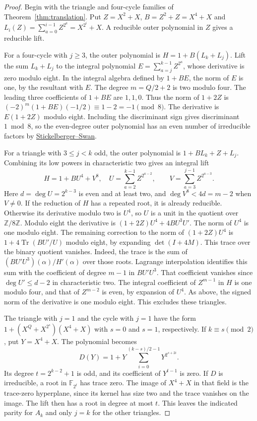 \documentclass[11pt]{article}
\begin{document}
\begin{proof}
Begin with the triangle and four-cycle families of
Theorem~\ref{thm:translation}. Put \(Z=X^2+X\), \(B=Z^2+Z=X^4+X\)
and \(L_i(Z)=\sum_{a=0}^{i-1}Z^{2^a}=X^{2^i}+X\).
A reducible outer polynomial in \(Z\) gives a reducible lift.

For a four-cycle with \(j\ge3\), the outer polynomial is
\(H=1+B(L_k+L_j)\). Lift the sum \(L_k+L_j\) to the integral
polynomial \(E=\sum_{a=j}^{k-1}Z^{2^a}\), whose derivative is
zero modulo eight. In the integral algebra defined by \(1+BE\),
the norm of \(E\) is one, by the resultant with \(E\).
The degree \(m=Q/2+2\) is two modulo four. The leading three
coefficients of \(1+BE\) are \(1,1,0\).
Thus the norm of \(1+2Z\) is
\((-2)^m(1+BE)(-1/2)\equiv1-2=-1\pmod8\).
The derivative is \(E(1+2Z)\) modulo eight. Including the
discriminant sign gives discriminant \(1\bmod8\), so the even-degree
outer polynomial has an even number of irreducible factors by
\href{https://msp.org/pjm/1962/12-3/pjm-v12-n3-p27-p.pdf}
{Stickelberger--Swan}.

For a triangle with \(3\le j<k\) odd, the outer polynomial is
\(1+B L_k+Z+L_j\). Combining its low powers in characteristic two
gives an integral lift
\[
 H=1+B U^4+V^8,\quad
 U=\sum_{a=2}^{k-1} Z^{2^{a-2}},\qquad
 V=\sum_{a=3}^{j-1} Z^{2^{a-3}} .
\]
Here \(d=\deg U=2^{k-3}\) is even and at least two, and
\(\deg V^8<4d=m-2\) when \(V\ne0\). If the reduction of \(H\)
has a repeated root, it is already reducible. Otherwise its
derivative modulo two is \(U^4\), so \(U\) is a unit in the quotient
over \(\mathbb Z/8\mathbb Z\).
Modulo eight the derivative is
\((1+2Z)U^4+4BU^3U'\). The norm of \(U^4\) is one modulo eight.
The remaining correction to the norm of \((1+2Z)U^4\) is
\(1+4\operatorname{Tr}(BU'/U)\) modulo eight, by expanding
\(\det(I+4M)\). This trace over the binary quotient vanishes.
Indeed, the trace is the sum of
\((BU'U^3)(\alpha)/H'(\alpha)\) over those roots. Lagrange
interpolation identifies this sum with the coefficient of degree
\(m-1\) in \(BU'U^3\). That coefficient vanishes since
\(\deg U'\le d-2\) in characteristic two. The integral coefficient
of \(Z^{m-1}\) in \(H\) is one modulo four, and that of \(Z^{m-2}\)
is even, by expansion of \(U^4\). As above, the signed norm of the
derivative is one modulo eight. This excludes these triangles.

The triangle with \(j=1\) and the cycle with \(j=1\) have the form
\(1+(X^Q+X^{2^s})(X^4+X)\) with \(s=0\) and \(s=1\), respectively.
If \(k\equiv s\pmod2\), put \(Y=X^4+X\). The polynomial becomes
\[
 D(Y)=1+Y\sum_{i=0}^{(k-s)/2-1}Y^{2^{s+2i}} .
\]
Its degree \(t=2^{k-2}+1\) is odd, and its coefficient of
\(Y^{t-1}\) is zero. If \(D\) is irreducible, a root in
\(\mathbb F_{2^t}\) has trace zero. The image of \(X^4+X\) in that
field is the trace-zero hyperplane, since its kernel has size two
and the trace vanishes on the image. The lift then has a root in
degree at most \(t\). This leaves the indicated parity for \(A_k\)
and only \(j=k\) for the other triangles.
\end{proof}
\end{document}
